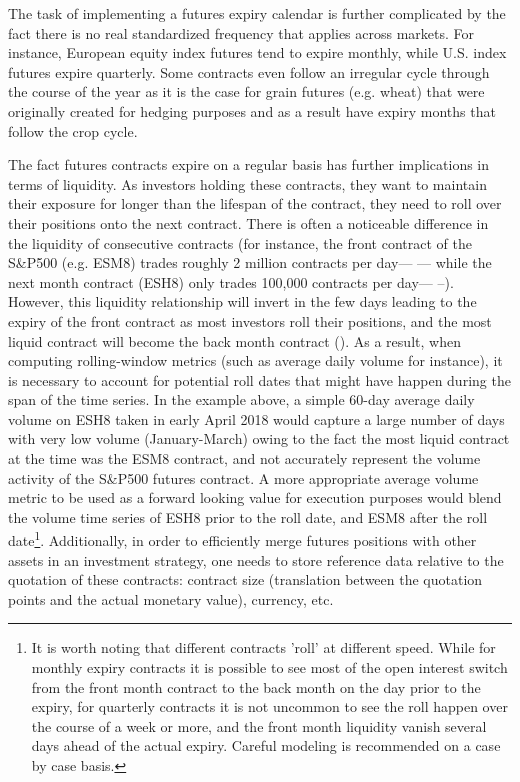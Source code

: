 \begin{itemize}
The task of implementing a futures expiry calendar is further complicated by the fact there is no real standardized frequency that applies across markets. For instance, European equity index futures tend to expire monthly, while U.S. index futures expire quarterly. Some contracts even follow an irregular cycle through the course of the year as it is the case for grain futures (e.g. wheat) that were originally created for hedging purposes and as a result have expiry months that follow the crop cycle. 


The fact futures contracts expire on a regular basis has further implications in terms of liquidity. As investors holding these contracts, they want to maintain their exposure for longer than the lifespan of the contract, they need to roll over their positions onto the next contract. There is often a noticeable difference in the liquidity of consecutive contracts (for instance, the front contract of the S\&P500 (e.g. ESM8) trades roughly 2 million contracts per day--- --- while the next month contract (ESH8) only trades 100,000 contracts per day---  --). However, this liquidity relationship will invert in the few days leading to the expiry of the front contract as most investors roll their positions, and the most liquid contract will become the back month contract (). As a result, when computing rolling-window metrics (such as average daily volume for instance), it is necessary to account for potential roll dates that might have happen during the span of the time series. In the example above, a simple 60-day average daily volume on ESH8 taken in early April 2018 would capture a large number of days with very low volume (January-March) owing to the fact the most liquid contract at the time was the ESM8 contract, and not accurately represent the volume activity of the S\&P500 futures contract. A more appropriate average volume metric to be used as a forward looking value for execution purposes would blend the volume time series of ESH8 prior to the roll date, and ESM8 after the roll date\footnote{It is worth noting that different contracts 'roll' at different speed. While for monthly expiry contracts it is possible to see most of the open interest switch from the front month contract to the back month on the day prior to the expiry, for quarterly contracts it is not uncommon to see the roll happen over the course of a week or more, and the front month liquidity vanish several days ahead of the actual expiry. Careful modeling is recommended on a case by case basis.}. Additionally, in order to efficiently merge futures positions with other assets in an investment strategy, one needs to store reference data relative to the quotation of these contracts: contract size (translation between the quotation points and the actual monetary value), currency, etc. 



\end{itemize}
